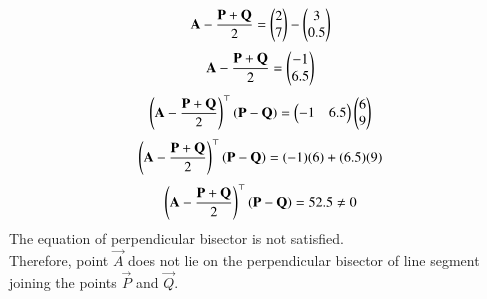 \documentclass[journal]{IEEEtran}
\begin{document}
\begin{align}
    \mathbf{A}-\frac{\mathbf{P}+\mathbf{Q}}{2}=\begin{pmatrix}2\\7\end{pmatrix}-\begin{pmatrix}3\\0.5\end{pmatrix} 
\end{align}
\begin{align}
    \mathbf{A}-\frac{\mathbf{P}+\mathbf{Q}}{2}=\begin{pmatrix}-1\\6.5\end{pmatrix}   
\end{align}
\begin{align}
    \left(\mathbf{A}-\frac{\mathbf{P}+\mathbf{Q}}{2}\right)^\top\left(\mathbf{P}-\mathbf{Q}\right)=\begin{pmatrix}-1&6.5\end{pmatrix}\begin{pmatrix}6\\9\end{pmatrix}
\end{align}
\begin{align}
    \left(\mathbf{A}-\frac{\mathbf{P}+\mathbf{Q}}{2}\right)^\top\left(\mathbf{P}-\mathbf{Q}\right)=(-1)(6)+(6.5)(9)
\end{align}
\begin{align}
    \left(\mathbf{A}-\frac{\mathbf{P}+\mathbf{Q}}{2}\right)^\top\left(\mathbf{P}-\mathbf{Q}\right)=52.5\neq0
\end{align}
The equation of perpendicular bisector is not satisfied.\\
Therefore, point $\vec{A}$ does not lie on the perpendicular bisector of line segment joining the points $\vec{P}$ and $\vec{Q}$.
\end{document}
